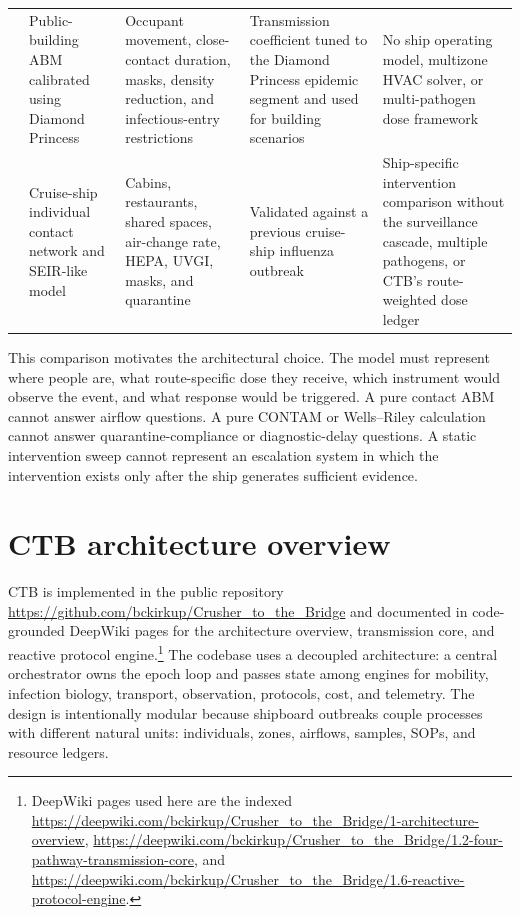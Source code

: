 {\begin{longtable}{p{}p{}p{}p{}p{}}
\citet{DOrazio2020RestartPublicBuildings} & Public-building ABM calibrated using Diamond Princess & Occupant movement, close-contact duration, masks, density reduction, and infectious-entry restrictions & Transmission coefficient tuned to the Diamond Princess epidemic segment and used for building scenarios & No ship operating model, multizone HVAC solver, or multi-pathogen dose framework \\
\citet{Zheng2016CruiseShipInterventions} & Cruise-ship individual contact network and SEIR-like model & Cabins, restaurants, shared spaces, air-change rate, HEPA, UVGI, masks, and quarantine & Validated against a previous cruise-ship influenza outbreak & Ship-specific intervention comparison without the surveillance cascade, multiple pathogens, or CTB's route-weighted dose ledger \\
\bottomrule
\end{longtable}}

This comparison motivates the architectural choice. The model must represent where people are, what route-specific dose they receive, which instrument would observe the event, and what
response would be triggered. A pure contact ABM cannot answer airflow questions. A pure CONTAM or Wells--Riley calculation cannot answer quarantine-compliance or diagnostic-delay questions.
A static intervention sweep cannot represent an escalation system in which the intervention exists only after the ship generates sufficient evidence.

\section{CTB architecture overview}
CTB is implemented in the public repository \url{https://github.com/bckirkup/Crusher_to_the_Bridge} and documented in code-grounded DeepWiki pages for the architecture overview, transmission
core, and reactive protocol engine.\footnote{DeepWiki pages used here are the indexed \url{https://deepwiki.com/bckirkup/Crusher_to_the_Bridge/1-architecture-overview},
\url{https://deepwiki.com/bckirkup/Crusher_to_the_Bridge/1.2-four-pathway-transmission-core}, and \url{https://deepwiki.com/bckirkup/Crusher_to_the_Bridge/1.6-reactive-protocol-engine}.} The
codebase uses a decoupled architecture: a central orchestrator owns the epoch loop and passes state among engines for mobility, infection biology, transport, observation, protocols, cost,
and telemetry. The design is intentionally modular because shipboard outbreaks couple processes with different natural units: individuals, zones, airflows, samples, SOPs, and resource
ledgers.


